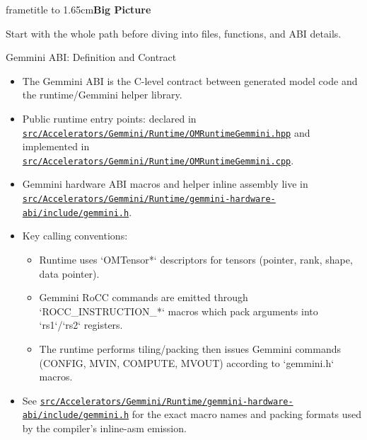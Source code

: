 \documentclass[aspectratio=169,10pt]{beamer}
\newcommand{\repoRoot}{/home/lahcen/toolchains/onnx-mlir-xcompile/onnx-mlir}
\newcommand{\pathcode}[1]{\href{run:\repoRoot/#1}{\texttt{\scriptsize #1}}}
\newcommand{\sectiondivider}[2]{
  \begin{frame}[plain]
    \vspace*{1.75cm}
    \begin{beamercolorbox}[wd=\paperwidth,ht=1.65cm,dp=0cm,center]{frametitle}
      \vbox to 1.65cm{\vfil{\Large\bfseries #1}\vfil}
    \end{beamercolorbox}
    \vspace{0.65cm}
    \begin{center}
      {\large #2}
    \end{center}
  \end{frame}
}
\begin{document}
\sectiondivider{Big Picture}{Start with the whole path before diving into files, functions, and ABI details.}
\begin{frame}{Gemmini ABI: Definition and Contract}
  \scriptsize
  \begin{itemize}
    \item The Gemmini ABI is the C-level contract between generated model code and the runtime/Gemmini helper library.
    \item Public runtime entry points: declared in \pathcode{src/Accelerators/Gemmini/Runtime/OMRuntimeGemmini.hpp} and implemented in \pathcode{src/Accelerators/Gemmini/Runtime/OMRuntimeGemmini.cpp}.
    \item Gemmini hardware ABI macros and helper inline assembly live in \pathcode{src/Accelerators/Gemmini/Runtime/gemmini-hardware-abi/include/gemmini.h}.
    \item Key calling conventions:
      \begin{itemize}
        \item Runtime uses `OMTensor*` descriptors for tensors (pointer, rank, shape, data pointer).
        \item Gemmini RoCC commands are emitted through `ROCC_INSTRUCTION_*` macros which pack arguments into `rs1`/`rs2` registers.
        \item The runtime performs tiling/packing then issues Gemmini commands (CONFIG, MVIN, COMPUTE, MVOUT) according to `gemmini.h` macros.
      \end{itemize}
    \item See \pathcode{src/Accelerators/Gemmini/Runtime/gemmini-hardware-abi/include/gemmini.h} for the exact macro names and packing formats used by the compiler's inline-asm emission.
  \end{itemize}
\end{frame}
\end{document}
